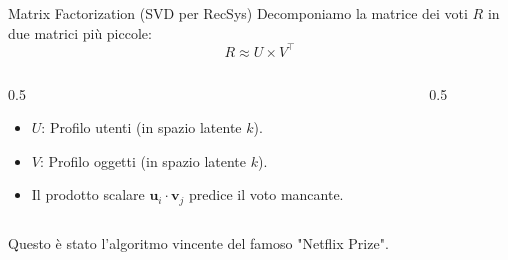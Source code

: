 \documentclass[aspectratio=169, 10pt]{beamer}
\begin{document}
\begin{frame}{Matrix Factorization (SVD per RecSys)}
    Decomponiamo la matrice dei voti $R$ in due matrici più piccole:
    \[ R \approx U \times V^\top \]
    
    \begin{columns}
        \begin{column}{0.5\textwidth}
            \begin{itemize}
                \item $U$: Profilo utenti (in spazio latente $k$).
                \item $V$: Profilo oggetti (in spazio latente $k$).
                \item Il prodotto scalare $\mathbf{u}_i \cdot \mathbf{v}_j$ predice il voto mancante.
            \end{itemize}
        \end{column}
        \begin{column}{0.5\textwidth}
            \centering
        \end{column}
    \end{columns}
    \vspace{0.5em}
    \small Questo è stato l'algoritmo vincente del famoso "Netflix Prize".
\end{frame}
\end{document}
